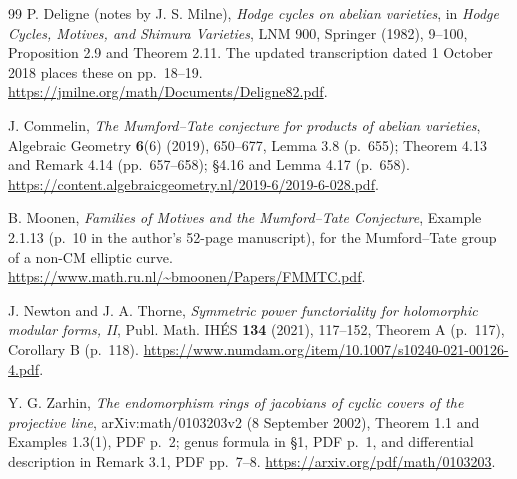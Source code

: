 \documentclass[11pt]{article}
\theoremstyle{remark}
\begin{document}
\begin{thebibliography}{99}
P. Deligne (notes by J. S. Milne), \emph{Hodge cycles on abelian
varieties}, in \emph{Hodge Cycles, Motives, and Shimura Varieties},
LNM 900, Springer (1982), 9--100, Proposition 2.9 and Theorem 2.11.
The updated transcription dated 1 October 2018 places these on
pp.~18--19.
\url{https://jmilne.org/math/Documents/Deligne82.pdf}.

J. Commelin, \emph{The Mumford--Tate conjecture for products of
abelian varieties}, Algebraic Geometry \textbf{6}(6) (2019), 650--677,
Lemma 3.8 (p.~655); Theorem 4.13 and Remark 4.14 (pp.~657--658);
\S4.16 and Lemma 4.17 (p.~658).
\url{https://content.algebraicgeometry.nl/2019-6/2019-6-028.pdf}.

B. Moonen, \emph{Families of Motives and the Mumford--Tate Conjecture},
Example 2.1.13 (p.~10 in the author's 52-page manuscript),
for the Mumford--Tate group of a non-CM elliptic curve.
\url{https://www.math.ru.nl/~bmoonen/Papers/FMMTC.pdf}.

J. Newton and J. A. Thorne, \emph{Symmetric power functoriality for
holomorphic modular forms, II}, Publ. Math. IH\'ES \textbf{134}
(2021), 117--152, Theorem A (p.~117), Corollary B (p.~118).
\url{https://www.numdam.org/item/10.1007/s10240-021-00126-4.pdf}.

Y. G. Zarhin, \emph{The endomorphism rings of jacobians of cyclic
covers of the projective line}, arXiv:math/0103203v2 (8 September
2002), Theorem 1.1 and Examples 1.3(1), PDF p.~2; genus formula in
\S1, PDF p.~1, and differential description in Remark 3.1,
PDF pp.~7--8.
\url{https://arxiv.org/pdf/math/0103203}.


\end{thebibliography}
\end{document}
